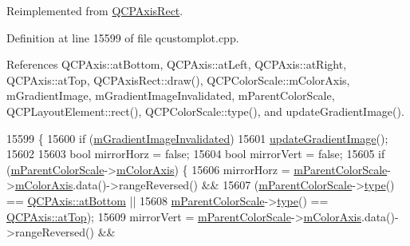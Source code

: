Reimplemented from \hyperlink{class_q_c_p_axis_rect_afb1bbbbda8345cd2710d92ee48440b53}{Q\+C\+P\+Axis\+Rect}.



Definition at line 15599 of file qcustomplot.\+cpp.



References Q\+C\+P\+Axis\+::at\+Bottom, Q\+C\+P\+Axis\+::at\+Left, Q\+C\+P\+Axis\+::at\+Right, Q\+C\+P\+Axis\+::at\+Top, Q\+C\+P\+Axis\+Rect\+::draw(), Q\+C\+P\+Color\+Scale\+::m\+Color\+Axis, m\+Gradient\+Image, m\+Gradient\+Image\+Invalidated, m\+Parent\+Color\+Scale, Q\+C\+P\+Layout\+Element\+::rect(), Q\+C\+P\+Color\+Scale\+::type(), and update\+Gradient\+Image().


\begin{DoxyCode}
15599                                                            \{
15600   \textcolor{keywordflow}{if} (\hyperlink{class_q_c_p_color_scale_axis_rect_private_a2c0b15b071e1f93006b48b5be022a631}{mGradientImageInvalidated})
15601     \hyperlink{class_q_c_p_color_scale_axis_rect_private_a73754cab312aeaddea1bfcc67cc079ac}{updateGradientImage}();
15602 
15603   \textcolor{keywordtype}{bool} mirrorHorz = \textcolor{keyword}{false};
15604   \textcolor{keywordtype}{bool} mirrorVert = \textcolor{keyword}{false};
15605   \textcolor{keywordflow}{if} (\hyperlink{class_q_c_p_color_scale_axis_rect_private_a311c73f51a4cb0b556388197833cf099}{mParentColorScale}->\hyperlink{class_q_c_p_color_scale_a2efbc90fd31898fe05d2b74a8422b1d5}{mColorAxis}) \{
15606     mirrorHorz = \hyperlink{class_q_c_p_color_scale_axis_rect_private_a311c73f51a4cb0b556388197833cf099}{mParentColorScale}->\hyperlink{class_q_c_p_color_scale_a2efbc90fd31898fe05d2b74a8422b1d5}{mColorAxis}.data()->rangeReversed() &&
15607                  (\hyperlink{class_q_c_p_color_scale_axis_rect_private_a311c73f51a4cb0b556388197833cf099}{mParentColorScale}->\hyperlink{class_q_c_p_color_scale_a9a5236328c97fbfde01e3d91c4fcce6a}{type}() == 
      \hyperlink{class_q_c_p_axis_ae2bcc1728b382f10f064612b368bc18aa220d68888516b6c3b493d144f1ba438f}{QCPAxis::atBottom} ||
15608                   \hyperlink{class_q_c_p_color_scale_axis_rect_private_a311c73f51a4cb0b556388197833cf099}{mParentColorScale}->\hyperlink{class_q_c_p_color_scale_a9a5236328c97fbfde01e3d91c4fcce6a}{type}() == 
      \hyperlink{class_q_c_p_axis_ae2bcc1728b382f10f064612b368bc18aac0ece2b680d3f545e701f75af1655977}{QCPAxis::atTop});
15609     mirrorVert = \hyperlink{class_q_c_p_color_scale_axis_rect_private_a311c73f51a4cb0b556388197833cf099}{mParentColorScale}->\hyperlink{class_q_c_p_color_scale_a2efbc90fd31898fe05d2b74a8422b1d5}{mColorAxis}.data()->rangeReversed() &&

\end{DoxyCode}

